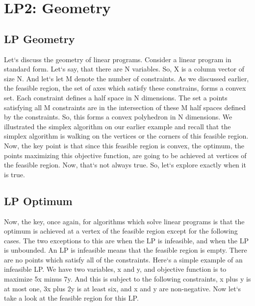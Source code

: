\section{LP2: Geometry}

\subsection{LP Geometry}
Let`s discuss the geometry of linear programs.
Consider a linear program in standard form.
Let`s say, that there are N variables.
So, X is a column vector of size N\@.
And let`s let M denote the number of constraints.
As we discussed earlier, the feasible region, the set of axes which satisfy these constrains, forms a convex set.
Each constraint defines a half space in N dimensions.
The set a points satisfying all M constraints are in the intersection of these M half spaces defined by the constraints.
So, this forms a convex polyhedron in N dimensions.
We illustrated the simplex algorithm on our earlier example and recall that the simplex algorithm is walking on the vertices or the corners of this feasible region.
Now, the key point is that since this feasible region is convex, the optimum, the points maximizing this objective function, are going to be achieved at vertices of the feasible region.
Now, that`s not always true.
So, let`s explore exactly when it is true.

\subsection{LP Optimum}
Now, the key, once again, for algorithms which solve linear programs is that the optimum is achieved at a vertex of the feasible region except for the following cases.
The two exceptions to this are when the LP is infeasible, and when the LP is unbounded.
An LP is infeasible means that the feasible region is empty.
There are no points which satisfy all of the constraints.
Here`s a simple example of an infeasible LP\@.
We have two variables, x and y, and objective function is to maximize 5x minus 7y.
And this is subject to the following constraints, x plus y is at most one, 3x plus 2y is at least six, and x and y are non-negative.
Now let`s take a look at the feasible region for this LP\@.

